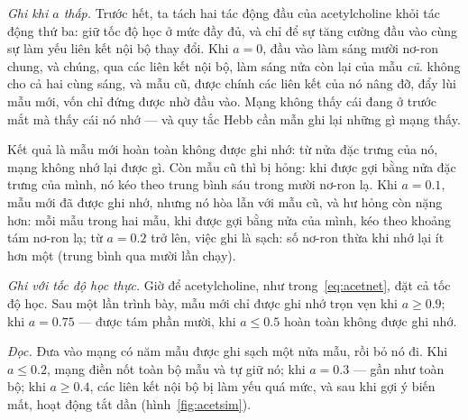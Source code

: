 \emph{Ghi khi $a$ thấp.} Trước hết, ta tách hai tác động đầu của acetylcholine khỏi tác động thứ ba: giữ tốc độ học ở mức đầy đủ, và chỉ để sự tăng cường đầu vào cùng sự làm yếu liên kết nội bộ thay đổi. Khi $a=0$, đầu vào làm sáng mười nơ-ron chung, và chúng, qua các liên kết nội bộ, làm sáng nửa còn lại của mẫu \emph{cũ}.  không cho cả hai cùng sáng, và mẫu cũ, được chính các liên kết của nó nâng đỡ, đẩy lùi mẫu mới, vốn chỉ đứng được nhờ đầu vào. Mạng không thấy cái đang ở trước mắt mà thấy cái nó nhớ --- và quy tắc Hebb cần mẫn ghi lại những gì mạng thấy.

Kết quả là mẫu mới hoàn toàn không được ghi nhớ: từ nửa đặc trưng của nó, mạng không nhớ lại được gì. Còn mẫu cũ thì bị hỏng: khi được gợi bằng nửa đặc trưng của mình, nó kéo theo trung bình sáu trong mười nơ-ron lạ. Khi $a=0.1$, mẫu mới đã được ghi nhớ, nhưng nó hòa lẫn với mẫu cũ, và hư hỏng còn nặng hơn: mỗi mẫu trong hai mẫu, khi được gợi bằng nửa của mình, kéo theo khoảng tám nơ-ron lạ; từ $a=0.2$ trở lên, việc ghi là sạch: số nơ-ron thừa khi nhớ lại ít hơn một (trung bình qua mười lần chạy).

\emph{Ghi với tốc độ học thực.} Giờ để acetylcholine, như trong~\eqref{eq:acetnet}, đặt cả tốc độ học. Sau một lần trình bày, mẫu mới chỉ được ghi nhớ trọn vẹn khi $a\ge0.9$; khi $a=0.75$ --- được tám phần mười, khi $a\le0.5$ hoàn toàn không được ghi nhớ.

\emph{Đọc.} Đưa vào mạng có năm mẫu được ghi sạch một nửa mẫu, rồi bỏ nó đi. Khi $a\le0.2$, mạng điền nốt toàn bộ mẫu và tự giữ nó; khi $a=0.3$ --- gần như toàn bộ; khi $a\ge0.4$, các liên kết nội bộ bị làm yếu quá mức, và sau khi gợi ý biến mất, hoạt động tắt dần (hình~\ref{fig:acetsim}).

